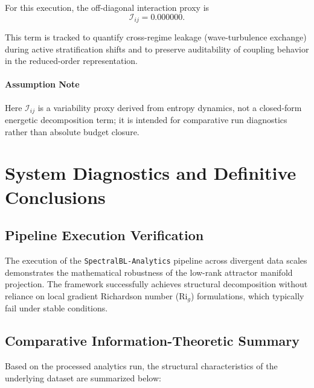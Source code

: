 \documentclass[11pt,a4paper]{article}
\begin{document}
For this execution, the off-diagonal interaction proxy is
\[
\mathcal{I}_{ij} = 0.000000.
\]

This term is tracked to quantify cross-regime leakage (wave-turbulence exchange) during active stratification shifts and to preserve auditability of coupling behavior in the reduced-order representation.

\paragraph{Assumption Note}
Here $\mathcal{I}_{ij}$ is a variability proxy derived from entropy dynamics, not a closed-form energetic decomposition term; it is intended for comparative run diagnostics rather than absolute budget closure.

\label{sec:regime_cases-99}
 
\newpage



\section{System Diagnostics and Definitive Conclusions}

\subsection{Pipeline Execution Verification}

The execution of the \texttt{SpectralBL-Analytics} pipeline across divergent data scales demonstrates the mathematical robustness of the low-rank attractor manifold projection. The framework successfully achieves structural decomposition without reliance on local gradient Richardson number ($\text{Ri}_g$) formulations, which typically fail under stable conditions.

\subsection{Comparative Information-Theoretic Summary}

Based on the processed analytics run, the structural characteristics of the underlying dataset are summarized below:
\end{document}
